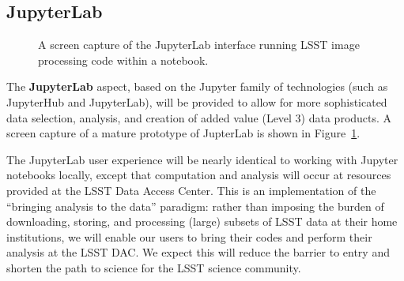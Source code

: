 \documentclass[DM,lsstdraft,toc]{lsstdoc}
\begin{document}
\subsection{JupyterLab\label{sec:jupyter}}

\begin{figure}
	\centering
	\caption{A screen capture of the JupyterLab interface running LSST image processing code within a notebook. \label{fig:JupyterLab}}
\end{figure}

The \textbf{JupyterLab} aspect, based on the Jupyter family of technologies (such as
JupyterHub and JupyterLab), will be provided to allow for more sophisticated
data selection, analysis, and creation of added value (Level 3) data
products. A screen capture of a mature prototype of JupterLab is shown in
Figure~\ref{fig:JupyterLab}.

The JupyterLab user experience will be nearly identical to working with
Jupyter notebooks locally, except that computation and analysis will occur
at resources provided at the LSST Data Access Center.  This is an
implementation of the “bringing analysis to the data” paradigm: rather
than imposing the burden of downloading, storing, and processing (large)
subsets of LSST data at their home institutions, we will enable our users to
bring their codes and perform their analysis at the LSST DAC.  We expect
this will reduce the barrier to entry and shorten the path to science for
the LSST science community.
\end{document}
